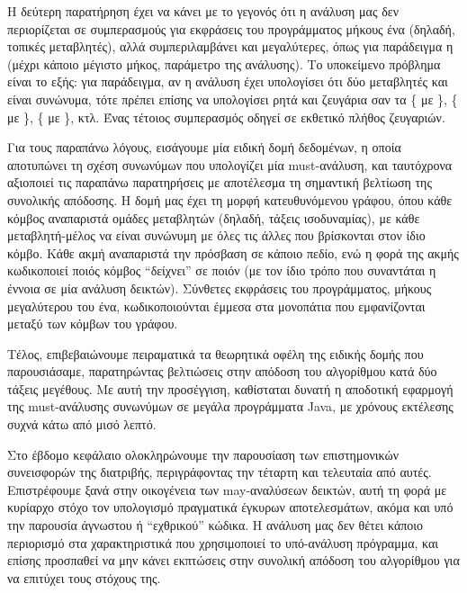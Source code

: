 Η δεύτερη παρατήρηση έχει να κάνει με το γεγονός ότι η ανάλυση μας δεν περιορίζεται σε συμπερασμούς για εκφράσεις του προγράμματος μήκους ένα (δηλαδή, τοπικές μεταβλητές), αλλά συμπεριλαμβάνει και μεγαλύτερες, όπως για παράδειγμα η {\en {}} (μέχρι κάποιο μέγιστο μήκος, παράμετρο της ανάλυσης). Το υποκείμενο πρόβλημα είναι το εξής: για παράδειγμα, αν η ανάλυση έχει υπολογίσει ότι δύο μεταβλητές {\en {}} και {\en {}} είναι συνώνυμα, τότε πρέπει επίσης να υπολογίσει ρητά και ζευγάρια σαν τα \{{\en {}} με {\en {}}\}, \{{\en {}} με {\en {}}\}, \{{\en {}} με {\en {}}\}, κτλ. Ένας τέτοιος συμπερασμός οδηγεί σε εκθετικό πλήθος ζευγαριών.

Για τους παραπάνω λόγους, εισάγουμε μία ειδική δομή δεδομένων, η οποία αποτυπώνει τη σχέση συνωνύμων που υπολογίζει μία {\en must}-ανάλυση, και ταυτόχρονα αξιοποιεί τις παραπάνω παρατηρήσεις με αποτέλεσμα τη σημαντική βελτίωση της συνολικής απόδοσης. Η δομή μας έχει τη μορφή κατευθυνόμενου γράφου, όπου κάθε κόμβος αναπαριστά ομάδες μεταβλητών (δηλαδή, τάξεις ισοδυναμίας), με κάθε μεταβλητή-μέλος να είναι συνώνυμη με όλες τις άλλες που βρίσκονται στον ίδιο κόμβο. Κάθε ακμή αναπαριστά την πρόσβαση σε κάποιο πεδίο, ενώ η φορά της ακμής κωδικοποιεί ποιός κόμβος ``δείχνει'' σε ποιόν (με τον ίδιο τρόπο που συναντάται η έννοια σε μία ανάλυση δεικτών). Σύνθετες εκφράσεις του προγράμματος, μήκους μεγαλύτερου του ένα, κωδικοποιούνται έμμεσα στα μονοπάτια που εμφανίζονται μεταξύ των κόμβων του γράφου.

Τέλος, επιβεβαιώνουμε πειραματικά τα θεωρητικά οφέλη της ειδικής δομής που παρουσιάσαμε, παρατηρώντας βελτιώσεις στην απόδοση του αλγορίθμου κατά δύο τάξεις μεγέθους. Με αυτή την προσέγγιση, καθίσταται δυνατή η αποδοτική εφαρμογή της {\en must}-ανάλυσης συνωνύμων σε μεγάλα προγράμματα {\en Java}, με χρόνους εκτέλεσης συχνά κάτω από μισό λεπτό.


Στο έβδομο κεφάλαιο ολοκληρώνουμε την παρουσίαση των επιστημονικών συνεισφορών της διατριβής, περιγράφοντας την τέταρτη και τελευταία \mbox{από} αυτές. Επιστρέφουμε ξανά στην οικογένεια των {\en may}-αναλύσεων δεικτών, αυτή τη φορά με κυρίαρχο στόχο τον υπολογισμό πραγματικά έγκυρων αποτελεσμάτων, ακόμα και υπό την παρουσία άγνωστου ή ``εχθρικού'' κώδικα. Η ανάλυση μας δεν θέτει κάποιο περιορισμό στα \mbox{χαρακτηριστικά} που χρησιμοποιεί το υπό-ανάλυση πρόγραμμα, και επίσης προσπαθεί να μην κάνει εκπτώσεις στην συνολική απόδοση του αλγορίθμου για να επιτύχει τους στόχους της.

